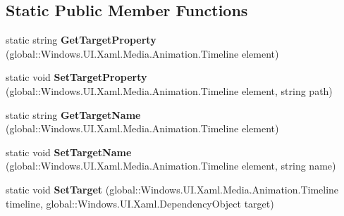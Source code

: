 \subsection*{Static Public Member Functions}
\begin{DoxyCompactItemize}
\item 
\mbox{\label{class_windows_1_1_u_i_1_1_xaml_1_1_media_1_1_animation_1_1_storyboard_a992ba47ffd0cf9810bb90b1fefa1b861}} 
static string {\bfseries Get\+Target\+Property} (global\+::\+Windows.\+U\+I.\+Xaml.\+Media.\+Animation.\+Timeline element)
\item 
\mbox{\label{class_windows_1_1_u_i_1_1_xaml_1_1_media_1_1_animation_1_1_storyboard_ab3c2752dde5914726dbdb8671f80b4bf}} 
static void {\bfseries Set\+Target\+Property} (global\+::\+Windows.\+U\+I.\+Xaml.\+Media.\+Animation.\+Timeline element, string path)
\item 
\mbox{\label{class_windows_1_1_u_i_1_1_xaml_1_1_media_1_1_animation_1_1_storyboard_a4ad4c5f27f472132b6e4ec18554505e0}} 
static string {\bfseries Get\+Target\+Name} (global\+::\+Windows.\+U\+I.\+Xaml.\+Media.\+Animation.\+Timeline element)
\item 
\mbox{\label{class_windows_1_1_u_i_1_1_xaml_1_1_media_1_1_animation_1_1_storyboard_a50a435394c414f84722c631eb3ce3840}} 
static void {\bfseries Set\+Target\+Name} (global\+::\+Windows.\+U\+I.\+Xaml.\+Media.\+Animation.\+Timeline element, string name)
\item 
\mbox{\label{class_windows_1_1_u_i_1_1_xaml_1_1_media_1_1_animation_1_1_storyboard_a9a120900e03e5275519d4f240ae6671b}} 
static void {\bfseries Set\+Target} (global\+::\+Windows.\+U\+I.\+Xaml.\+Media.\+Animation.\+Timeline timeline, global\+::\+Windows.\+U\+I.\+Xaml.\+Dependency\+Object target)
\item 
\mbox{\label{class_windows_1_1_u_i_1_1_xaml_1_1_media_1_1_animation_1_1_storyboard_a992ba47ffd0cf9810bb90b1fefa1b861}} 

\end{DoxyCompactItemize}
